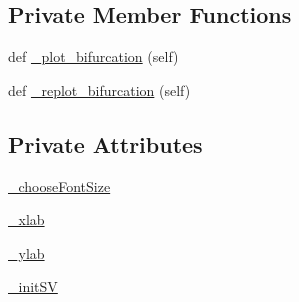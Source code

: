 \subsection*{Private Member Functions}
\begin{DoxyCompactItemize}
\item 
def \hyperlink{class_mu_mo_t_1_1_mu_mo_tbifurcation_view_a385e5f82733060fec5122635ae6a8e67}{\+\_\+plot\+\_\+bifurcation} (self)
\item 
def \hyperlink{class_mu_mo_t_1_1_mu_mo_tbifurcation_view_a13b207330e0a4fe5bb7c3b863bbd0820}{\+\_\+replot\+\_\+bifurcation} (self)
\end{DoxyCompactItemize}
\subsection*{Private Attributes}
\begin{DoxyCompactItemize}
\item 
\hyperlink{class_mu_mo_t_1_1_mu_mo_tbifurcation_view_a6a353a1ef9443ae375948d592ed6cec6}{\+\_\+choose\+Font\+Size}
\item 
\hyperlink{class_mu_mo_t_1_1_mu_mo_tbifurcation_view_a865b2109ba10d874e84d4a354873b121}{\+\_\+xlab}
\item 
\hyperlink{class_mu_mo_t_1_1_mu_mo_tbifurcation_view_aac1a25a634d53e524573f67eb5f3a7b9}{\+\_\+ylab}
\item 
\hyperlink{class_mu_mo_t_1_1_mu_mo_tbifurcation_view_a5c3de6779b1f8c64730cee48ca65491d}{\+\_\+init\+SV}
\end{DoxyCompactItemize}
